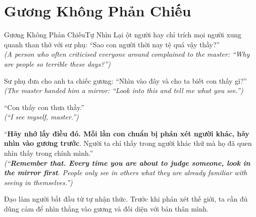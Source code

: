 \section{Gương Không Phản Chiếu}
\begin{truyen}{Gương Không Phản Chiếu}{Tự Nhìn Lại}
ột người hay chỉ trích mọi người xung quanh than thở với sư phụ: ``Sao con người thời nay tệ quá vậy thầy?''\\
\textit{(A person who often criticised everyone around complained to the master: ``Why are people so terrible these days?'')}

Sư phụ đưa cho anh ta chiếc gương: ``Nhìn vào đây và cho ta biết con thấy gì?''\\
\textit{(The master handed him a mirror: ``Look into this and tell me what you see.'')}

``Con thấy con thưa thầy.''\\
\textit{(``I see myself, master.'')}

``\textbf{Hãy nhớ lấy điều đó. Mỗi lần con chuẩn bị phán xét người khác, hãy nhìn vào gương trước}. Người ta chỉ thấy trong người khác thứ mà họ đã quen nhìn thấy trong chính mình.''\\
\textit{(``\textbf{Remember that. Every time you are about to judge someone, look in the mirror first}. People only see in others what they are already familiar with seeing in themselves.'')}
\end{truyen}
\begin{baihoc}
  Đạo làm người bắt đầu từ tự nhận thức. Trước khi phán xét thế giới, ta cần đủ dũng cảm để nhìn thẳng vào gương và đối diện với bản thân mình.
\end{baihoc}
